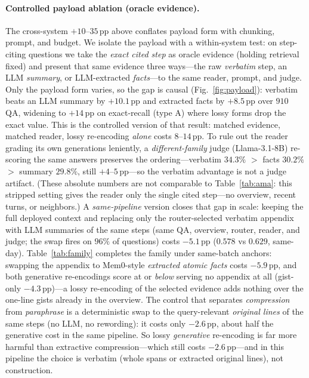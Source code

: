 \documentclass{article} %
\newcommand{\pp}{\,\mathrm{pp}}
\begin{document}
\paragraph{Controlled payload ablation (oracle evidence).}
The cross-system $+10$--$35\pp$ above conflates payload form with chunking, prompt, and budget. We
isolate the payload with a within-system test: on step-citing questions we take the \emph{exact cited
step} as oracle evidence (holding retrieval fixed) and present that same evidence three ways---the raw
\emph{verbatim} step, an LLM \emph{summary}, or LLM-extracted \emph{facts}---to the same
reader, prompt, and judge. Only the payload form varies, so the gap is causal (Fig.~\ref{fig:payload}):
verbatim beats an LLM summary by $+10.1\pp$ and extracted facts by $+8.5\pp$ over $910$ QA, widening to
$+14\pp$ on exact-recall (type A) where lossy forms drop the exact value. This is the controlled version
of that result: matched evidence, matched reader, lossy re-encoding \emph{alone} costs
$8$--$14\pp$. To rule out the reader grading its own generations leniently, a \emph{different-family}
judge (Llama-3.1-8B) re-scoring the same answers preserves the ordering---verbatim $34.3\%$ $>$ facts
$30.2\%$ $>$ summary $29.8\%$, still $+4$--$5\pp$---so the verbatim advantage is not a judge artifact.
(These absolute numbers are not comparable to Table~\ref{tab:ama}: this stripped
setting gives the reader only the single cited step---no overview, recent turns, or neighbors.) A \emph{same-pipeline} version closes that gap in scale: keeping the full
deployed context and replacing only the router-selected verbatim appendix with LLM summaries of the same
steps (same QA, overview, router, reader, and judge; the swap fires on $96\%$ of questions) costs
$-5.1\pp$ ($0.578$ vs $0.629$, same-day). Table~\ref{tab:family} completes the family under
same-batch anchors: swapping the appendix to Mem0-style \emph{extracted atomic facts} costs
$-5.9\pp$, and both generative re-encodings score at or \emph{below} serving no appendix at all
(gist-only $-4.3\pp$)---a lossy re-encoding of the selected evidence adds nothing over the one-line
gists already in the overview. The control that separates \emph{compression} from \emph{paraphrase}
is a deterministic swap to the query-relevant \emph{original lines} of the same steps (no LLM, no
rewording): it costs only $-2.6\pp$, about half the generative cost in the same pipeline. So lossy \emph{generative}
re-encoding is far more harmful than extractive compression---which still costs
$-2.6\pp$---and in this pipeline the choice is verbatim (whole spans or extracted
original lines), not construction.
\end{document}
